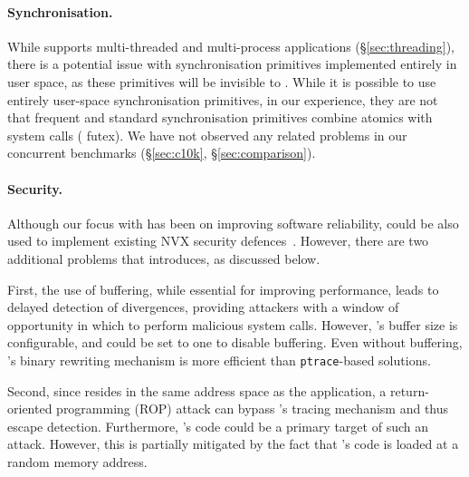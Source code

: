 \paragraph{Synchronisation.} While \varan supports multi-threaded and
multi-process applications (\S\ref{sec:threading}), there is a
potential issue with synchronisation primitives implemented entirely
in user space, as these primitives will be invisible to \varan. While
it is possible to use entirely user-space synchronisation primitives,
in our experience, they are not that frequent and standard
synchronisation primitives combine atomics with system calls (\ie
futex). We have not observed any related problems in our concurrent
benchmarks (\S\ref{sec:c10k}, \S\ref{sec:comparison}).

\paragraph{Security.} Although our focus with \varan has been on
improving software reliability, \varan could be also used to implement
existing NVX security defences~\cite{cox2006,orchestra09}.  However,
there are two additional problems that \varan introduces, as discussed
below.

First, the use of buffering, while essential for improving
performance, leads to delayed detection of divergences, providing
attackers with a window of opportunity in which to perform malicious
system calls.  However, \varan's buffer size is configurable, and
could be set to one to disable buffering. Even without buffering,
\varan's binary rewriting mechanism is more efficient than
\lstinline`ptrace`-based solutions.

Second, since \varan resides in the same address space as the
application, a return-oriented programming (ROP) attack can bypass
\varan's tracing mechanism and thus escape detection.  Furthermore,
\varan's code could be a primary target of such an attack. However,
this is partially mitigated by the fact that \varan's code is loaded
at a random memory address.
